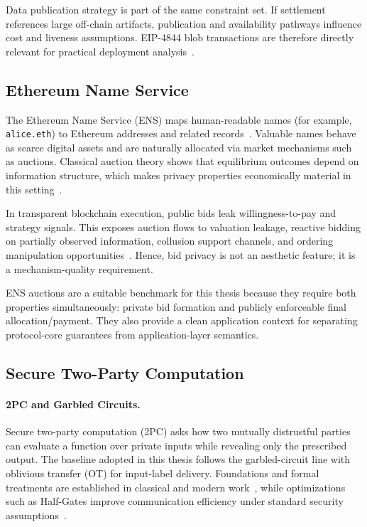 \documentclass[final,twoside]{vutinfth}
\begin{document}
Data publication strategy is part of the same constraint set. If settlement references large off-chain artifacts, publication and availability pathways influence cost and liveness assumptions. EIP-4844 blob transactions are therefore directly relevant for practical deployment analysis~\cite{Buterin2022EIP4844}.

\subsection{Ethereum Name Service}
The Ethereum Name Service (ENS) maps human-readable names (for example, \texttt{alice.eth}) to Ethereum addresses and related records~\cite{EIP137ENS,ENSDocs}. Valuable names behave as scarce digital assets and are naturally allocated via market mechanisms such as auctions. Classical auction theory shows that equilibrium outcomes depend on information structure, which makes privacy properties economically material in this setting~\cite{MilgromWeber1982}.

In transparent blockchain execution, public bids leak willingness-to-pay and strategy signals. This exposes auction flows to valuation leakage, reactive bidding on partially observed information, collusion support channels, and ordering manipulation opportunities~\cite{Daian2019FlashBoys}. Hence, bid privacy is not an aesthetic feature; it is a mechanism-quality requirement.

ENS auctions are a suitable benchmark for this thesis because they require both properties simultaneously: private bid formation and publicly enforceable final allocation/payment. They also provide a clean application context for separating protocol-core guarantees from application-layer semantics.

\subsection{Secure Two-Party Computation}
\paragraph*{2PC and Garbled Circuits.}
Secure two-party computation (2PC) asks how two mutually distrustful parties can evaluate a function over private inputs while revealing only the prescribed output. The baseline adopted in this thesis follows the garbled-circuit line with oblivious transfer (OT) for input-label delivery. Foundations and formal treatments are established in classical and modern work~\cite{Bellare2012FoundationsGC,LindellPinkas2008}, while optimizations such as Half-Gates improve communication efficiency under standard security assumptions~\cite{Zahur2015HalfGates}.
\end{document}

